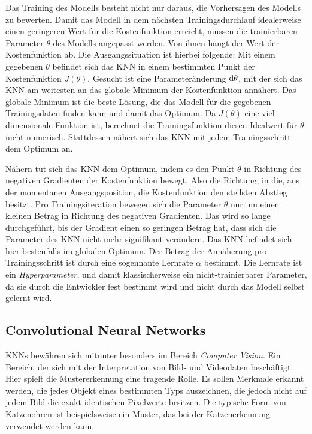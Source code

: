 Das Training des Modells besteht nicht nur daraus, die Vorhersagen des Modells zu bewerten. Damit das Modell in dem nächsten Trainingsdurchlauf idealerweise einen geringeren Wert für die Kostenfunktion erreicht, müssen die trainierbaren Parameter $\theta$ des Modells angepasst werden. Von ihnen hängt der Wert der Kostenfunktion ab. Die Ausgangssituation ist hierbei folgende: Mit einem gegebenen $\theta$ befindet sich das \ac{KNN} in einem bestimmten Punkt der Kostenfunktion $J(\theta)$. Gesucht ist eine Parameteränderung $\mathop{}\!\mathrm{d}\theta$, mit der sich das \ac{KNN} am weitesten an das globale Minimum der Kostenfunktion annähert. Das globale Minimum ist die beste Lösung, die das Modell für die gegebenen Trainingsdaten finden kann und damit das Optimum. Da $J(\theta)$ eine viel-dimensionale Funktion ist, berechnet die Trainingsfunktion diesen Idealwert für $\theta$ nicht numerisch. Stattdessen nähert sich das \ac{KNN} mit jedem Trainingsschritt dem Optimum an. \cite{knnsKompakt}

Nähern tut sich das \ac{KNN} dem Optimum, indem es den Punkt $\theta$ in Richtung des negativen Gradienten der Kostenfunktion bewegt. Also die Richtung, in die, aus der momentanen Ausgangsposition, die Kostenfunktion den steilsten Abstieg besitzt. Pro Trainingsiteration bewegen sich die Parameter $\theta$ nur um einen kleinen Betrag in Richtung des negativen Gradienten. Das wird so lange durchgeführt, bis der Gradient einen so geringen Betrag hat, dass sich die Parameter des \ac{KNN} nicht mehr signifikant verändern. Das \ac{KNN} befindet sich hier bestenfalls im globalen Optimum. Der Betrag der Annäherung pro Trainingsschritt ist durch eine sogennante Lernrate $\alpha$ bestimmt. Die Lernrate ist ein \emph{Hyperparameter}, und damit klassischerweise ein nicht-trainierbarer Parameter, da sie durch die Entwickler fest bestimmt wird und nicht durch das Modell selbst gelernt wird. \cite{knnsKompakt}


\subsection{Convolutional Neural Networks}
\acp{KNN} bewähren sich mitunter besonders im Bereich \emph{Computer Vision}. Ein Bereich, der sich mit der Interpretation von Bild- und Videodaten beschäftigt. Hier spielt die Mustererkennung eine tragende Rolle. Es sollen Merkmale erkannt werden, die jedes Objekt eines bestimmten Typs auszeichnen, die jedoch nicht auf jedem Bild die exakt identischen Pixelwerte besitzen. Die typische Form von Katzenohren ist beispielsweise ein Muster, das bei der Katzenerkennung verwendet werden kann. \cite{knnsKompakt}

